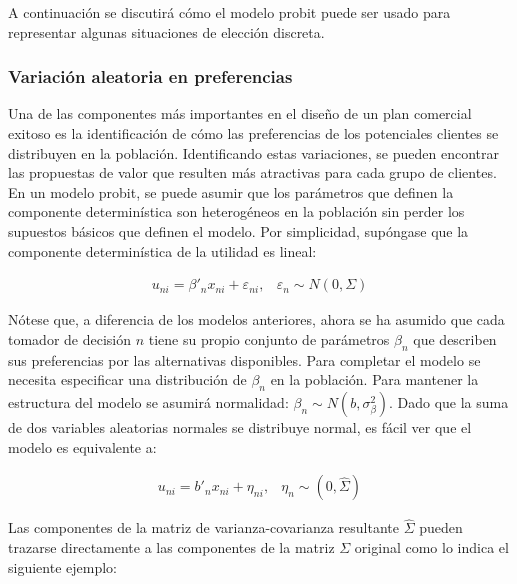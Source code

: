 \documentclass[
]{book}
\begin{document}
A continuación se discutirá cómo el modelo probit puede ser usado para representar algunas situaciones de elección discreta.

\subsubsection{Variación aleatoria en preferencias}\label{variaciuxf3n-aleatoria-en-preferencias}

Una de las componentes más importantes en el diseño de un plan comercial exitoso es la identificación de cómo las preferencias de los potenciales clientes se distribuyen en la población. Identificando estas variaciones, se pueden encontrar las propuestas de valor que resulten más atractivas para cada grupo de clientes. En un modelo probit, se puede asumir que los parámetros que definen la componente determinística son heterogéneos en la población sin perder los supuestos básicos que definen el modelo. Por simplicidad, supóngase que la componente determinística de la utilidad es lineal:

\begin{equation} 
  \begin{array}{cc}
    u_{ni} = \beta'_{n} x_{ni} + \varepsilon_{ni}, & \varepsilon_n \sim N(0,\Sigma)
  \end{array}  
  \label{eq:cdeterminista}
\end{equation}

Nótese que, a diferencia de los modelos anteriores, ahora se ha asumido que cada tomador de decisión \(n\) tiene su propio conjunto de parámetros \(\beta_n\) que describen sus preferencias por las alternativas disponibles. Para completar el modelo se necesita especificar una distribución de \(\beta_n\) en la población. Para mantener la estructura del modelo se asumirá normalidad: \(\beta_n \sim N(b, \sigma^2_\beta)\). Dado que la suma de dos variables aleatorias normales se distribuye normal, es fácil ver que el modelo es equivalente a:

\begin{equation} 
  \begin{array}{cc}
    u_{ni} = b'_{n} x_{ni} + \eta_{ni}, & \eta_n \sim (0,\hat{\Sigma})
  \end{array}  
  \label{eq:cdeterministaequi}
\end{equation}

Las componentes de la matriz de varianza-covarianza resultante \(\hat{\Sigma}\) pueden trazarse directamente a las componentes de la matriz \(\Sigma\) original como lo indica el siguiente ejemplo:
\end{document}
